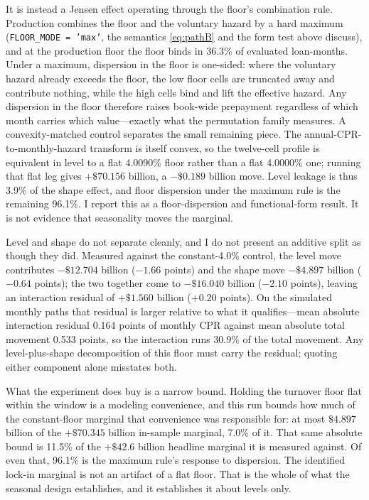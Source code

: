 \documentclass[12pt]{article}
\begin{document}
It is instead a Jensen effect operating through the floor's combination rule. Production combines the floor and the voluntary hazard by a hard maximum (\texttt{FLOOR\_MODE = 'max'}, the semantics \eqref{eq:pathB} and the form test above discuss), and at the production floor the floor binds in 36.3\% of evaluated loan-months. Under a maximum, dispersion in the floor is one-sided: where the voluntary hazard already exceeds the floor, the low floor cells are truncated away and contribute nothing, while the high cells bind and lift the effective hazard. Any dispersion in the floor therefore raises book-wide prepayment regardless of which month carries which value---exactly what the permutation family measures. A convexity-matched control separates the small remaining piece. The annual-CPR-to-monthly-hazard transform is itself convex, so the twelve-cell profile is equivalent in level to a flat 4.0090\% floor rather than a flat 4.0000\% one; running that flat leg gives $+\$70.156$ billion, a $-\$0.189$ billion move. Level leakage is thus 3.9\% of the shape effect, and floor dispersion under the maximum rule is the remaining 96.1\%. I report this as a floor-dispersion and functional-form result. It is not evidence that seasonality moves the marginal.

Level and shape do not separate cleanly, and I do not present an additive split as though they did. Measured against the constant-4.0\% control, the level move contributes $-\$12.704$ billion ($-1.66$ points) and the shape move $-\$4.897$ billion ($-0.64$ points); the two together come to $-\$16.040$ billion ($-2.10$ points), leaving an interaction residual of $+\$1.560$ billion ($+0.20$ points). On the simulated monthly paths that residual is larger relative to what it qualifies---mean absolute interaction residual 0.164 points of monthly CPR against mean absolute total movement 0.533 points, so the interaction runs 30.9\% of the total movement. Any level-plus-shape decomposition of this floor must carry the residual; quoting either component alone misstates both.

What the experiment does buy is a narrow bound. Holding the turnover floor flat within the window is a modeling convenience, and this run bounds how much of the constant-floor marginal that convenience was responsible for: at most $\$4.897$ billion of the $+\$70.345$ billion in-sample marginal, 7.0\% of it. That same absolute bound is 11.5\% of the $+\$42.6$ billion headline marginal it is measured against. Of even that, 96.1\% is the maximum rule's response to dispersion. The identified lock-in marginal is not an artifact of a flat floor. That is the whole of what the seasonal design establishes, and it establishes it about levels only.
\end{document}
